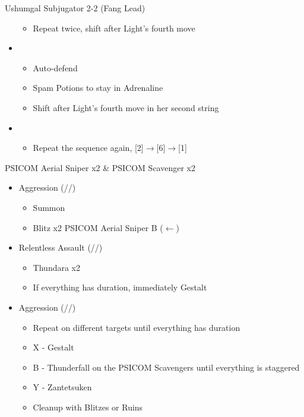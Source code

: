 \begin{battle}[2:25]{Ushumgal Subjugator 2-2 (Fang Lead)}
\begin{itemize}
\begin{itemize}
				      \item Repeat twice, shift after Light's fourth move
			      \end{itemize}
			\item \fourth
			      \begin{itemize}
				      \item Auto-defend
				      \item Spam Potions to stay in Adrenaline
				      \item Shift after Light's fourth move in her second string
			      \end{itemize}
			\item \second
			      \begin{itemize}
				      \item Repeat the sequence again, [2]$\rightarrow$[6]$\rightarrow$[1]
			      \end{itemize}
		\end{itemize}
	\end{battle}
	\renewcommand{\first}{[1] Aggression (\com/\com/\rav)}
	\renewcommand{\second}{[2] Relentless Assault (\rav/\com/\rav)}
	\begin{battle}[0:25]{PSICOM Aerial Sniper x2 \& PSICOM Scavenger x2}
		\begin{itemize}
			\item \first
			      \begin{itemize}
				      \item Summon
				      \item Blitz x2 PSICOM Aerial Sniper B ($\leftarrow$)
			      \end{itemize}
			\item \second
			      \begin{itemize}
				      \item Thundara x2
				      \item If everything has duration, immediately Gestalt
			      \end{itemize}
			\item \first
			      \begin{itemize}
				      \item Repeat on different targets until everything has duration
				      \item X - Gestalt
				      \item B - Thunderfall on the PSICOM Scavengers until everything is staggered
				      \item Y - Zantetsuken
				      \item Cleanup with Blitzes or Ruins
			      \end{itemize}
		\end{itemize}
		 
	\end{battle}
